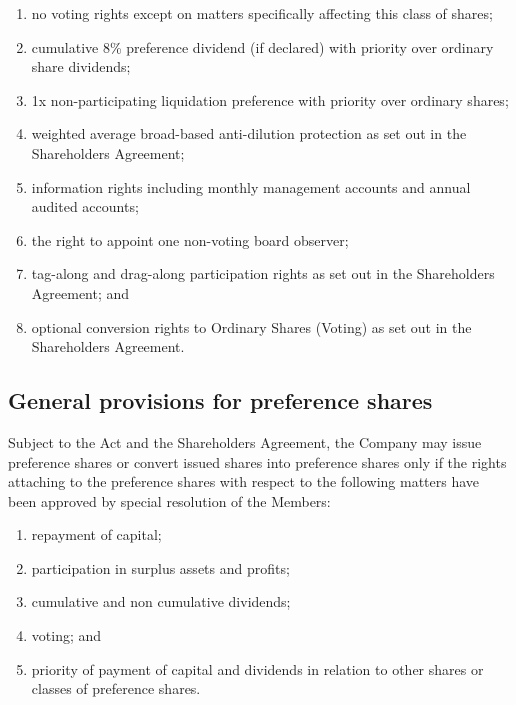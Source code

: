 \begin{enumerate}[label=(\alph*)]
    \item no voting rights except on matters specifically affecting this class of shares;
    
    \item cumulative 8\% preference dividend (if declared) with priority over ordinary share dividends;
    
    \item 1x non-participating liquidation preference with priority over ordinary shares;
    
    \item weighted average broad-based anti-dilution protection as set out in the Shareholders Agreement;
    
    \item information rights including monthly management accounts and annual audited accounts;
    
    \item the right to appoint one non-voting board observer;
    
    \item tag-along and drag-along participation rights as set out in the Shareholders Agreement; and
    
    \item optional conversion rights to Ordinary Shares (Voting) as set out in the Shareholders Agreement.
\end{enumerate}

\subsection{General provisions for preference shares}

Subject to the Act and the Shareholders Agreement, the Company may issue preference shares or convert issued shares into preference shares only if the rights attaching to the preference shares with respect to the following matters have been approved by special resolution of the Members:

\begin{enumerate}[label=(\alph*)]
    \item repayment of capital;
    \item participation in surplus assets and profits;
    \item cumulative and non cumulative dividends;
    \item voting; and
    \item priority of payment of capital and dividends in relation to other shares or classes of preference shares.
\end{enumerate}

